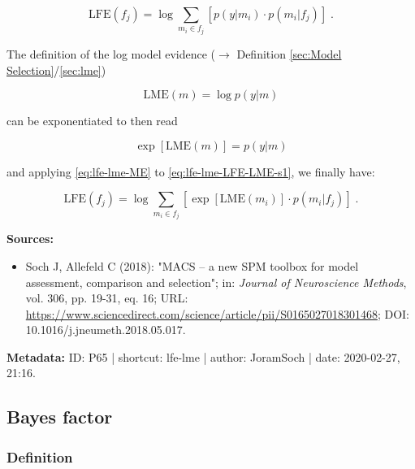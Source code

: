 \documentclass[a4paper,12pt,twoside]{book}
\begin{document}
\begin{equation} \label{eq:lfe-lme-LFE-LME-s1}
\mathrm{LFE}(f_j) = \log \sum_{m_i \in f_j} \left[ p(y|m_i) \cdot p(m_i|f_j) \right] \; .
\end{equation}

The definition of the log model evidence ($\rightarrow$ Definition \ref{sec:Model Selection}/\ref{sec:lme})

\begin{equation} \label{eq:lfe-lme-LME}
\mathrm{LME}(m) = \log p(y|m)
\end{equation}

can be exponentiated to then read

\begin{equation} \label{eq:lfe-lme-ME}
\exp\left[ \mathrm{LME}(m) \right] = p(y|m)
\end{equation}

and applying \eqref{eq:lfe-lme-ME} to \eqref{eq:lfe-lme-LFE-LME-s1}, we finally have:

\begin{equation} \label{eq:lfe-lme-LFE-LME-s2}
\mathrm{LFE}(f_j) = \log \sum_{m_i \in f_j} \left[ \exp[\mathrm{LME}(m_i)] \cdot p(m_i|f_j) \right] \; .
\end{equation}


\vspace{1em}
\textbf{Sources:}
\begin{itemize}
\item Soch J, Allefeld C (2018): "MACS – a new SPM toolbox for model assessment, comparison and selection"; in: \textit{Journal of Neuroscience Methods}, vol. 306, pp. 19-31, eq. 16; URL: \url{https://www.sciencedirect.com/science/article/pii/S0165027018301468}; DOI: 10.1016/j.jneumeth.2018.05.017.
\end{itemize}


\vspace{1em}
\textbf{Metadata:} ID: P65 | shortcut: lfe-lme | author: JoramSoch | date: 2020-02-27, 21:16.
\vspace{1em}



\subsection{Bayes factor}

\subsubsection[\textit{Definition}]{Definition} \label{sec:bf}
\setcounter{equation}{0}
\end{document}
